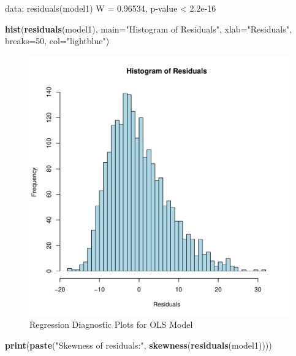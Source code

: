\documentclass[
]{article}
\newenvironment{Shaded}{\begin{snugshade}}{\end{snugshade}}
\newcommand{\AttributeTok}[1]{\textcolor[rgb]{0.13,0.29,0.53}{#1}}
\newcommand{\DecValTok}[1]{\textcolor[rgb]{0.00,0.00,0.81}{#1}}
\newcommand{\FunctionTok}[1]{\textcolor[rgb]{0.13,0.29,0.53}{\textbf{#1}}}
\newcommand{\NormalTok}[1]{#1}
\newcommand{\StringTok}[1]{\textcolor[rgb]{0.31,0.60,0.02}{#1}}
\begin{document}
data: residuals(model1) W = 0.96534, p-value \textless{} 2.2e-16

\begin{Shaded}
\begin{Highlighting}[]
  \FunctionTok{hist}\NormalTok{(}\FunctionTok{residuals}\NormalTok{(model1), }\AttributeTok{main=}\StringTok{"Histogram of Residuals"}\NormalTok{, }\AttributeTok{xlab=}\StringTok{"Residuals"}\NormalTok{, }\AttributeTok{breaks=}\DecValTok{50}\NormalTok{, }\AttributeTok{col=}\StringTok{"lightblue"}\NormalTok{)}
\end{Highlighting}
\end{Shaded}

\begin{figure}
\centering
\includegraphics{FinalProject_files/figure-latex/model1-diagnostics-3.pdf}
\caption{Regression Diagnostic Plots for OLS Model}
\end{figure}

\begin{Shaded}
\begin{Highlighting}[]
  \FunctionTok{print}\NormalTok{(}\FunctionTok{paste}\NormalTok{(}\StringTok{"Skewness of residuals:"}\NormalTok{, }\FunctionTok{skewness}\NormalTok{(}\FunctionTok{residuals}\NormalTok{(model1))))}
\end{Highlighting}
\end{Shaded}
\end{document}
